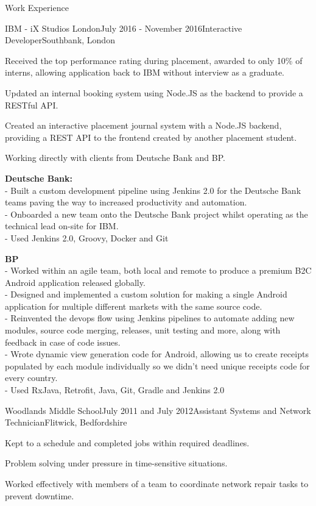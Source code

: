 \documentclass{resume} %
\begin{document}
\begin{rSection}{Work Experience}
	
\begin{rSubsection}{IBM - iX Studios London}{July 2016 - November 2016}{Interactive Developer}{Southbank, London}
	\item Received the top performance rating during placement, awarded to only 10\% of interns, allowing application back to IBM without interview as a graduate.
	\item Updated an internal booking system using Node.JS as the backend to provide a RESTful API.
	\item Created an interactive placement journal system with a Node.JS backend, providing a REST API to the frontend created by another placement student.
	\item Working directly with clients from Deutsche Bank and BP.
	\item \textbf{Deutsche Bank:}\\
	- Built a custom development pipeline using Jenkins 2.0 for the Deutsche Bank teams paving the way to increased productivity and automation.\\
	- Onboarded a new team onto the Deutsche Bank project whilst operating as the technical lead on-site for IBM.\\
	- Used Jenkins 2.0, Groovy, Docker and Git
	\item \textbf{BP}\\
	- Worked within an agile team, both local and remote to produce a premium B2C Android application released globally.\\
	- Designed and implemented a custom solution for making a single Android application for multiple different markets with the same source code.\\
	- Reinvented the devops flow using Jenkins pipelines to automate adding new modules, source code merging, releases, unit testing and more, along with feedback in case of code issues.\\
	- Wrote dynamic view generation code for Android, allowing us to create receipts populated by each module individually so we didn't need unique receipts code for every country.\\
	- Used RxJava, Retrofit, Java, Git, Gradle and Jenkins 2.0
\end{rSubsection}

\newpage
\begin{rSubsection}{Woodlands Middle School}{July 2011 and July 2012}{Assistant Systems and Network Technician}{Flitwick, Bedfordshire}
	\item Kept to a schedule and completed jobs within required deadlines.
	\item Problem solving under pressure in time-sensitive situations.
	\item Worked effectively with members of a team to coordinate network repair tasks to prevent downtime.
\end{rSubsection}


\end{rSection}
\end{document}
